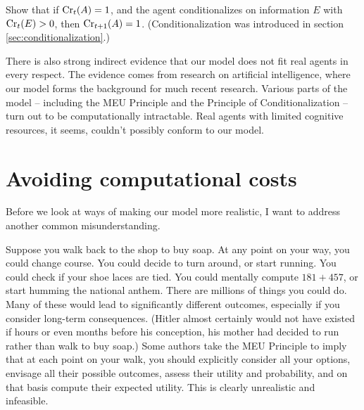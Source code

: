 \begin{exercise}{2}
  Show that if $\text{Cr}_t(A) = 1$, and the agent conditionalizes on information $E$
  with $\text{Cr}_t(E) > 0$, then $\text{Cr}_{t+1}(A) = 1$. (Conditionalization was
  introduced in section \ref{sec:conditionalization}.)
\end{exercise}


There is also strong indirect evidence that our model does not fit real agents
in every respect. The evidence comes from research on artificial intelligence,
where our model forms the background for much recent research. Various parts of
the model -- including the MEU Principle and the Principle of Conditionalization
-- turn out to be computationally intractable. Real agents with limited
cognitive resources, it seems, couldn't possibly conform to our model.

\section{Avoiding computational costs}

Before we look at ways of making our model more realistic, I want to address
another common misunderstanding.

Suppose you walk back to the shop to buy soap. At any point on your way, you
could change course. You could decide to turn around, or start running. You
could check if your shoe laces are tied. You could mentally compute
$181 + 457$, or start humming the national anthem. There are millions of
things you could do. Many of these would lead to significantly different
outcomes, especially if you consider long-term consequences. (Hitler almost
certainly would not have existed if hours or even months before his conception,
his mother had decided to run rather than walk to buy soap.) Some authors take
the MEU Principle to imply that at each point on your walk, you should
explicitly consider all your options, envisage all their possible outcomes,
assess their utility and probability, and on that basis compute their expected
utility. This is clearly unrealistic and infeasible.

